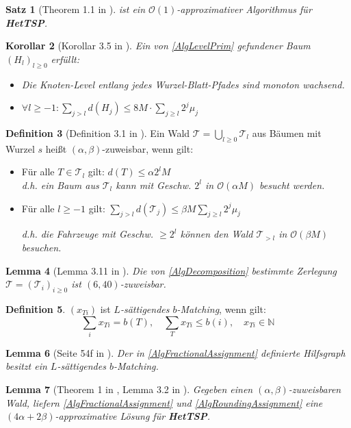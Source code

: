 \documentclass[a4paper,ngerman,12pt,bibtotoc]{scrartcl}
\theoremstyle{definition}
\newtheorem{defn}{Definition}[section]
\theoremstyle{plain}
\newtheorem{lemma}[defn]{Lemma}
\newtheorem{kor}[defn]{Korollar}
\newtheorem{satz}[defn]{Satz}
\theoremstyle{remark}
\newcommand{\NN}{\mathbb{N}}
\newcommand{\Tc}{\mathcal{T}}
\newcommand{\Oc}{\mathcal{O}}
\newcommand{\HetTSP}{\textbf{HetTSP}}
\begin{document}
	\begin{minipage}{0.05\textwidth}
		\phantom{Hallo}
	\end{minipage}
	\begin{minipage}{0.45\textwidth}
		\begin{satz}[Theorem 1.1 in \cite{HetCVRP}]
			 ist ein $\Oc(1)$-approximativer Algorithmus für \HetTSP.
		\end{satz}

		\begin{kor}[Korollar 3.5 in \cite{HetCVRP}]
			Ein von \cref{AlgLevelPrim} gefundener Baum $\left(H_l\right)_{l\geq 0}$ erfüllt:
			\begin{itemize}
				\item Die Knoten-Level entlang jedes Wurzel-Blatt-Pfades sind monoton wachsend.
				\item $\forall l\geq -1: \sum_{j>l} d(H_j) \leq 8M\cdot \sum_{j\geq l}2^j\mu_j$
			\end{itemize}
		\end{kor}

		\begin{defn}[Definition 3.1 in \cite{HetCVRP}]
			Ein Wald $\Tc = \bigcup_{l\geq 0} \Tc_l$ aus Bäumen mit Wurzel $s$ heißt $(\alpha, \beta)$-zuweisbar, wenn gilt:
			\begin{itemize}
				\item Für alle $T \in \Tc_l$ gilt: $d(T) \leq \alpha 2^l M$ \\
				\textit{d.h. ein Baum aus $\Tc_l$ kann mit Geschw. $2^l$ in $\Oc(\alpha M)$ besucht werden.}
				\item Für alle $l \geq -1$ gilt: $\sum_{j > l} d(\Tc_j) \leq \beta M \sum_{j\geq l} 2^j\mu_j$
				
				\textit{d.h. die Fahrzeuge mit Geschw. $\geq 2^l$ können den Wald $\Tc_{>l}$ in $\Oc(\beta M)$ besuchen.}
			\end{itemize}
		\end{defn}
		
		\begin{lemma}[Lemma 3.11 in \cite{HetCVRP}]
			Die von \cref{AlgDecomposition} bestimmte Zerlegung $\Tc = (\Tc_i)_{i\geq 0}$ ist $(6, 40)$-zuweisbar.
		\end{lemma}

		\begin{defn}
			$(x_{Ti})$ ist \emph{$L$-sättigendes $b$-Matching}, wenn gilt:
			\[\sum_i x_{Ti} = b(T),\quad \sum_T x_{Ti} \leq b(i),\quad x_{Ti}\in\NN\]
		\end{defn}
		
		\begin{lemma}[Seite 54f in \cite{bMatching}]
			Der in \cref{AlgFractionalAssignment} definierte Hilfsgraph besitzt ein $L$-sättigendes $b$-Matching.
		\end{lemma}

		\begin{lemma}[Theorem 1 in \cite{Rounding}, Lemma 3.2 in \cite{HetCVRP}]
			Gegeben einen $(\alpha, \beta)$-zuweisbaren Wald, liefern \cref{AlgFractionalAssignment} und \cref{AlgRoundingAssignment} eine $(4\alpha+2\beta)$-approximative Lösung für \HetTSP.
		\end{lemma}
	\end{minipage}
	
\end{document}

